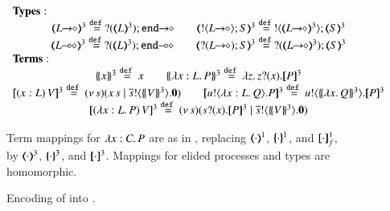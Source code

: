 \begin{figure}[t]
$
{%
\begin{array}{c}
	\multicolumn{1}{l}{\noindent{\bf Types:}}
	\\
	\tmap{\shot{L}}{3} \defeq \shot{\btinp{\tmap{L}{3}} \tinact}
	\qquad
	\tmap{\btout{\shot{L}} S}{3} \defeq \btout{\tmap{\shot{L}}{3}} \tmap{S}{3}
	\\
	\tmap{\lhot{L}}{3} \defeq \lhot{\btinp{\tmap{L}{3}} \tinact}
	\qquad \tmap{\btinp{\shot{L}} S}{3} \defeq \btinp{\tmap{\shot{L}}{3}} \tmap{S}{3}
	\\
	\multicolumn{1}{l}{\noindent{\bf Terms:}}
	\\
	\auxmap{x}{3} \defeq x
	\qquad
	\auxmap{\abs{x: L}{P}}{3} \defeq \abs{z}{\binp{z}{x} \pmap{P}{3}}
	\\
	\pmap{\appl{(x:L)}{V}}{3} \defeq \newsp{s}{\appl{x}{s} \Par \bout{\dual{s}}{\auxmap{V}{3}} \inact}
	\qquad
	\pmap{\bout{u}{\abs{x: L}{Q}} P}{3} \defeq \bout{u}{\auxmap{\abs{x}{Q}}{3} } \pmap{P}{3}
	\\
	\pmap{\appl{(\abs{x: L}{P})}{V}}{3} \defeq \newsp{s}{\binp{s}{x} \pmap{P}{3} \Par  \bout{\dual{s}}{\auxmap{V}{3}} \inact}
\end{array}
}
$

Term mappings for $\lambda x:C.\,P$ are
as in , replacing 
$(\!\!\langle\cdot\rangle\!\!)^{1}$,
$\{\!\!\{\cdot\}\!\!\}^{1}$, and 
$[\!\![\cdot]\!\!]^1_f$, by  
$(\!\!\langle\cdot\rangle\!\!)^{3}$,
$\{\!\!\{\cdot\}\!\!\}^{3}$, and 
$[\!\![\cdot]\!\!]^3$.
Mappings for elided processes and types are homomorphic.

\caption{\label{f:enc:hopip_to_hopi} Encoding of \HOpp into \HOp.}
\end{figure} 
